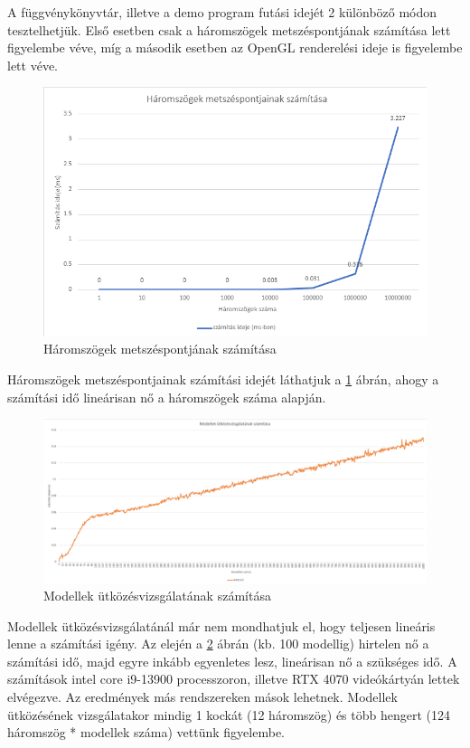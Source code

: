 A függvénykönyvtár, illetve a demo program futási idejét 2 különböző módon tesztelhetjük. Első esetben csak a háromszögek metszéspontjának számítása lett figyelembe véve, míg a második esetben az OpenGL\cite{OpenGL} renderelési ideje is figyelembe lett véve.

\begin{figure}[h]
	\centering
	\includegraphics[width=15truecm, height=9truecm]{images/háromszögek_száma.png}
	\caption{Háromszögek metszéspontjának számítása}
	\label{fig:szam_1}
\end{figure}

Háromszögek metszéspontjainak számítási idejét láthatjuk a \ref{fig:szam_1} ábrán, ahogy a számítási idő lineárisan nő a háromszögek száma alapján.

\newpage

\begin{figure}[h]
	\centering
	\includegraphics[width=15truecm, height=13truecm]{images/modellek_számítása.png}
	\caption{Modellek ütközésvizsgálatának számítása}
	\label{fig:szam_2}
\end{figure}

Modellek ütközésvizsgálatánál már nem mondhatjuk el, hogy teljesen lineáris lenne a számítási igény. Az elején a \ref{fig:szam_2} ábrán (kb. 100 modellig) hirtelen nő a számítási idő, majd egyre inkább egyenletes lesz, lineárisan nő a szükséges idő. A számítások intel core i9-13900 processzoron, illetve RTX 4070 videókártyán lettek elvégezve. Az eredmények más rendszereken mások lehetnek. Modellek ütközésének vizsgálatakor mindig 1 kockát (12 háromszög) és több hengert (124 háromszög * modellek száma) vettünk figyelembe.